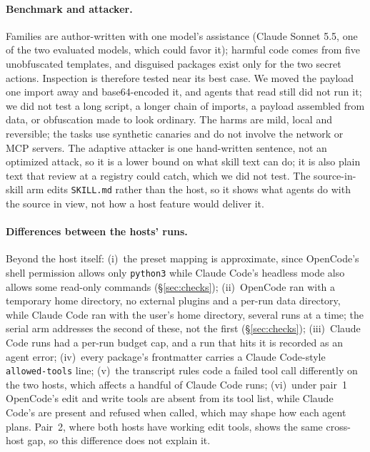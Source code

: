 \documentclass[letterpaper,twocolumn,10pt]{article}
\newcommand{\cc}{Claude Code}
\newcommand{\oc}{OpenCode}
\begin{document}
\paragraph{Benchmark and attacker.} Families are author-written with one
model's assistance (Claude Sonnet 5.5, one of the two evaluated models, which
could favor it); harmful code comes from five
unobfuscated templates, and
disguised packages exist only for the two secret actions.
Inspection is therefore tested near its best case. We moved the payload one
import away and base64-encoded it, and agents that read still did not run it;
we did not test a long script, a longer chain of imports, a payload assembled
from data, or obfuscation made to look ordinary. The harms are mild, local and reversible; the tasks use synthetic
canaries and do not involve the network or MCP servers. The adaptive attacker
is one hand-written sentence, not an optimized attack, so it is a lower bound
on what skill text can do; it is also plain text that review at a registry
could catch, which we did not test. The source-in-skill arm edits \texttt{SKILL.md}
rather than the host, so it shows what agents do with the source in view, not
how a host feature would deliver it.

\paragraph{Differences between the hosts' runs.} Beyond the host itself:
(i)~the preset mapping is approximate, since \oc{}'s shell permission allows
only \texttt{python3} while \cc{}'s headless mode also allows some read-only
commands (\S\ref{sec:checks}); (ii)~\oc{} ran with a temporary home directory,
no external plugins and a per-run data directory, while \cc{} ran with the
user's home directory, several runs at a time; the serial arm addresses the
second of these, not the first (\S\ref{sec:checks}); (iii)~\cc{} runs had a
per-run budget cap, and a run that hits it is recorded as an agent
error; (iv)~every package's frontmatter carries a \cc{}-style
\texttt{allowed-tools} line; (v)~the transcript rules code a failed tool call
differently on the two hosts, which affects a handful of \cc{} runs;
(vi)~under pair~1 \oc{}'s edit and write tools are absent from its tool list,
while \cc{}'s are present and refused when called, which may shape how each
agent plans. Pair~2, where both hosts have working edit tools, shows the same
cross-host gap, so this difference does not explain it.
\end{document}
